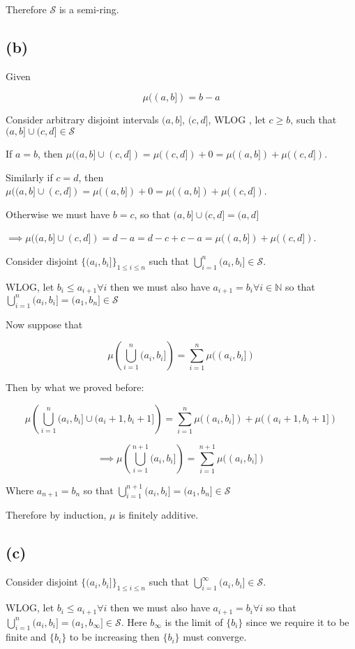 Therefore $\mathcal{S}$ is a semi-ring.

\subsection*{(b)}

Given

$$
\mu((a,b])=b-a
$$

Consider arbitrary disjoint intervals $(a,b]$, $(c,d]$, WLOG , let $c\geq b$, such that $(a,b]\cup(c,d]\in\mathcal{S}$

If $a=b$, then $\mu((a,b]\cup(c,d])=\mu((c,d])+0=\mu((a,b])+\mu((c,d])$.

Similarly if $c=d$, then $\mu((a,b]\cup(c,d])=\mu((a,b])+0=\mu((a,b])+\mu((c,d])$.

Otherwise we must have $b=c$, so that $(a,b]\cup(c,d]=(a,d]$

$\implies
\mu((a,b]\cup(c,d])=d-a=d-c+c-a=\mu((a,b])+\mu((c,d])$.

\bigskip

Consider disjoint $\{(a_i,b_i]\}_{1\leq i\leq n}$ such that $\bigcup_{i=1}^{n}(a_i,b_i]\in\mathcal{S}$.

WLOG, let $b_i\leq a_{i+1}\forall i$ then we must also have $a_{i+1}=b_{i}\forall i \in \mathbb{N}$ so that $\bigcup_{i=1}^{n}(a_i,b_i]=(a_1,b_n]\in\mathcal{S}$

Now suppose that

$$
\mu\left(
\bigcup_{i=1}^{n}
(a_i,b_i]
\right)
=
\sum_{i=1}^n
\mu((a_i,b_i])
$$

 


Then by what we proved before:

$$
\mu\left(
\bigcup_{i=1}^{n}
(a_i,b_i]
\cup
(a_i+1,b_i+1]
\right)
=
\sum_{i=1}^{n}
\mu((a_i,b_i])+\mu((a_i+1,b_i+1])
$$

$$
\implies
\mu\left(
\bigcup_{i=1}^{n+1}
(a_i,b_i]
\right)
=
\sum_{i=1}^{n+1}
\mu((a_i,b_i])
$$

Where $a_{n+1}=b_n$ so that $\bigcup_{i=1}^{n+1}(a_i,b_i]=(a_1,b_n]\in\mathcal{S}$ 

Therefore by induction, $\mu$ is finitely additive.

\subsection*{(c)}

Consider disjoint $\{(a_i,b_i]\}_{1\leq i\leq n}$ such that $\bigcup_{i=1}^{\infty}(a_i,b_i]\in\mathcal{S}$.

WLOG, let $b_i\leq a_{i+1}\forall i$ then we must also have $a_{i+1}=b_{i}\forall i$ so that $\bigcup_{i=1}^{n}(a_i,b_i]=(a_1,b_\infty]\in\mathcal{S}$. Here $b_\infty$ is the limit of $\{b_i\}$ since we require it to be finite and $\{b_i\}$ to be increasing then $\{b_i\}$ must converge.

